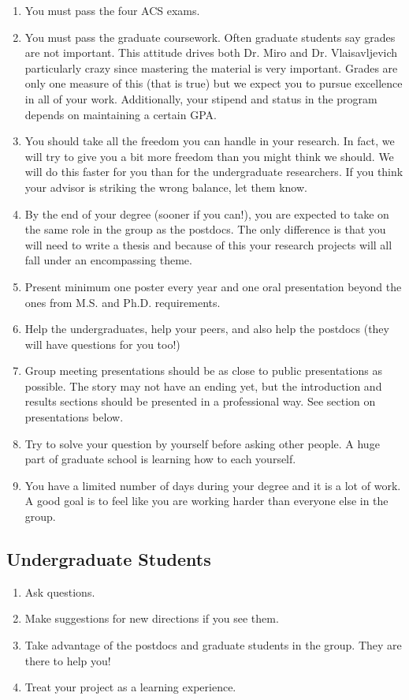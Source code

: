 \documentclass[letterpaper]{article}
\begin{document}
\begin{enumerate}
\item You must pass the four ACS exams.
\item You must pass the graduate coursework. Often graduate students say grades are not important. This attitude drives both Dr. Miro and Dr. Vlaisavljevich particularly crazy since mastering the material is very important. Grades are only one measure of this (that is true) but we expect you to pursue excellence in all of your work.  Additionally, your stipend and status in the program depends on maintaining a certain GPA.
\item You should take all the freedom you can handle in your research. In fact, we will try to give you a bit more freedom than you might think we should.  We will do this faster for you than for the undergraduate researchers. If you think your advisor is striking the wrong balance, let them know.
\item By the end of your degree (sooner if  you can!), you are expected to take on the same role in the group as the postdocs. The only difference is that you will need to write a thesis and because of this your research projects will all fall under an encompassing theme.
\item Present minimum one poster every year and one oral presentation beyond the ones from M.S. and Ph.D. requirements.
\item Help the undergraduates, help your peers, and also help the postdocs (they will have questions for you too!)
\item Group meeting presentations should be as close to public presentations as possible. The story may not have an ending yet, but the introduction and results sections should be presented in a professional way. See section on presentations below.
\item Try to solve your question by yourself before asking other people. A huge part of graduate school is learning how to each yourself.
\item You have a limited number of days during your degree and it is a lot of work. A good goal is to feel like you are working harder than everyone else in the group.
\end{enumerate}


\subsection*{Undergraduate Students}

\begin{enumerate}
\item Ask questions.
\item Make suggestions for new directions if you see them.
\item Take advantage of the postdocs and graduate students in the group. They are there to help you! 
\item Treat your project as a learning experience.
\end{enumerate}
\end{document}
